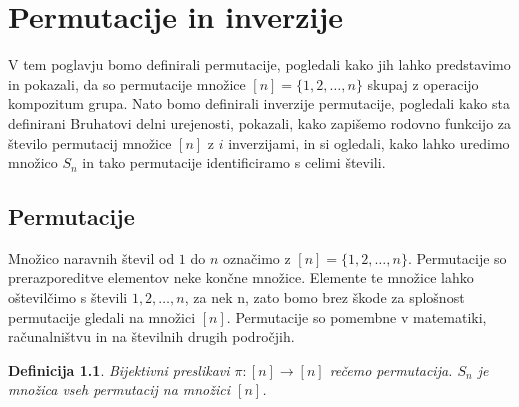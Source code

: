 \documentclass[a4paper, 12pt]{book}
\newtheorem{definicija}{Definicija}[chapter]
\begin{document}
\chapter{ Permutacije in inverzije }

V tem poglavju bomo definirali permutacije, pogledali kako jih lahko predstavimo in pokazali, da so permutacije množice $[n] = \{ 1, 2,\dots, n\}$ skupaj z operacijo kompozitum grupa. Nato bomo definirali inverzije permutacije, pogledali kako sta definirani Bruhatovi delni urejenosti, pokazali, kako zapišemo rodovno funkcijo za število permutacij množice $[n]$ z $i$ inverzijami, in si ogledali, kako lahko uredimo množico $S_n$ in tako permutacije identificiramo s celimi števili.

\section{ Permutacije }

Množico naravnih števil od $1$ do $n$ označimo z $[n] = \{ 1, 2,\dots, n\}$.
Permutacije so prerazporeditve elementov neke končne množice. Elemente te množice lahko oštevilčimo s števili $1, 2, \dots, n$, za nek n, zato bomo brez škode za splošnost permutacije gledali na množici $[n]$. 
Permutacije so pomembne v matematiki, računalništvu in na številnih drugih področjih. 



\begin{definicija}
Bijektivni preslikavi $\pi: [n] \rightarrow [n]$ rečemo permutacija. $S_n$ je množica vseh permutacij na množici $[n]$.
\end{definicija}
\end{document}
